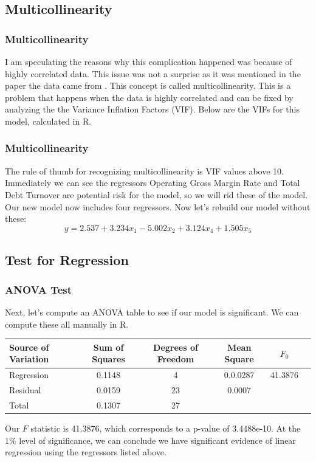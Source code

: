 \documentclass[12pt]{beamer}
\begin{document}
\subsection{Multicollinearity}
\begin{frame}
\frametitle{Multicollinearity}
I am speculating the reasons why this complication happened was because of highly correlated data. This issue was not a surprise as it was mentioned in the paper the data came from \cite{paper}. This concept is called multicollinearity. This is a problem that happens when the data is highly correlated and can be fixed by analyzing the the Variance Inflation Factors (VIF). Below are the VIFs for this model, calculated in R.
{\scriptsize
\begin{mdframed}

\end{mdframed}}
\end{frame}

\begin{frame}
\frametitle{Multicollinearity}
The rule of thumb for recognizing multicollinearity is VIF values above 10. Immediately we can see the regressors Operating Gross Margin Rate and Total Debt Turnover are potential risk for the model, so we will rid these of the model. Our new model now includes four regressors. Now let's rebuild our model without these: $$y=2.537+3.234x_1-5.002x_2+3.124x_4+1.505x_5$$
\end{frame}

\subsection{Test for Regression}
\begin{frame}
\frametitle{ANOVA Test}
Next, let's compute an ANOVA table to see if our model is significant. We can compute these all manually in R.
\begin{center}
{\scriptsize
\hspace*{-4mm}
\begin{tabular}{lccccc}
	\hline
	Source of Variation & Sum of Squares & Degrees of Freedom & Mean Square & $F_0$\\
	\hline
	Regression & 0.1148 & 4 & 0.0.0287 & 41.3876\\
	Residual & 0.0159 & 23 & 0.0007 &\\
	Total & 0.1307 & 27 & &\\
	\hline
\end{tabular}}
\end{center}
Our $F$ statistic is 41.3876, which corresponds to a p-value of 3.4488e-10. At the 1\% level of significance, we can conclude we have significant evidence of linear regression using the regressors listed above.
\end{frame}
\end{document}
